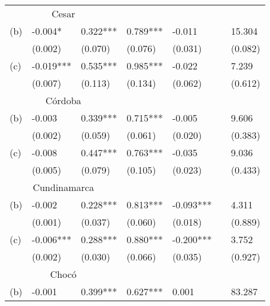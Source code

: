 \begin{table}[H]
\centering
\begin{tabular}{lllllll}
\multicolumn{3}{c}{Cesar} &       &       &       &  \\
\vspace{-0.3cm} (b) & -0.004* & 0.322*** & 0.789*** & -0.011 &       & 15.304\\   
& \scriptsize{(0.002)} & \scriptsize{(0.070)} & \scriptsize{(0.076)} & \scriptsize{(0.031)} &       & \scriptsize{(0.082)} \\
\vspace{-0.3cm} (c) & -0.019*** & 0.535*** & 0.985*** & -0.022 &       & 7.239\\   
& \scriptsize{(0.007)} & \scriptsize{(0.113)} & \scriptsize{(0.134)} & \scriptsize{(0.062)} &       & \scriptsize{(0.612)} \\
\hline \multicolumn{3}{c}{Córdoba} &       &       &       &  \\
\vspace{-0.3cm} (b) & -0.003 & 0.339*** & 0.715*** & -0.005 &       & 9.606\\   
& \scriptsize{(0.002)} & \scriptsize{(0.059)} & \scriptsize{(0.061)} & \scriptsize{(0.020)} &       & \scriptsize{(0.383)} \\
\vspace{-0.3cm} (c) & -0.008 & 0.447*** & 0.763*** & -0.035 &       & 9.036\\   
& \scriptsize{(0.005)} & \scriptsize{(0.079)} & \scriptsize{(0.105)} & \scriptsize{(0.023)} &       & \scriptsize{(0.433)} \\
\hline \multicolumn{3}{c}{Cundinamarca} &       &       &       &  \\
\vspace{-0.3cm} (b) & -0.002 & 0.228*** & 0.813*** & -0.093*** &       & 4.311\\   
& \scriptsize{(0.001)} & \scriptsize{(0.037)} & \scriptsize{(0.060)} & \scriptsize{(0.018)} &       & \scriptsize{(0.889)} \\
\vspace{-0.3cm} (c) & -0.006*** & 0.288*** & 0.880*** & -0.200*** &       & 3.752\\   
& \scriptsize{(0.002)} & \scriptsize{(0.030)} & \scriptsize{(0.066)} & \scriptsize{(0.035)} &       & \scriptsize{(0.927)} \\
\hline \multicolumn{3}{c}{Chocó} &       &       &       &  \\
\vspace{-0.3cm} (b) & -0.001 & 0.399*** & 0.627*** & 0.001 &       & 83.287\\   

\end{tabular}
\end{table}
